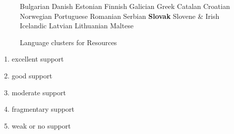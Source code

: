 \begin{multicols}{2}
\begin{figure}[htb]
\begin{tabular}
    Bulgarian\newline 
    Danish \newline 
    Estonian \newline 
    Finnish \newline 
    Galician \newline 
    Greek \newline 
    Catalan \newline 
    Croatian \newline 
    Norwegian \newline 
    Portuguese \newline 
    Romanian \newline 
    Serbian \newline 
    \textbf{Slovak} \newline 
    Slovene \newline
&  \vspace*{0.5mm} Irish \newline 
    Icelandic \newline 
    Latvian \newline 
    Lithuanian \newline 
    Maltese  \\
  \end{tabular}
  \caption{Language clusters for Resources}
  \label{fig:resources_cluster_en}
\end{figure}

  
\begin{enumerate}
  \item excellent support
  \item good support
  \item moderate support
  \item fragmentary support
  \item weak or no support
\end{enumerate}


\end{multicols}
